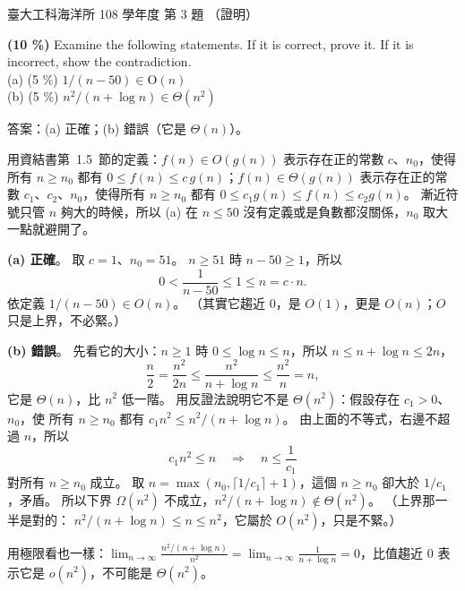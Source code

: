 \begin{pastexam}[label={px:ntu-108-esoe-ds-03}]{臺大工科海洋所 108 學年度 第 3 題}
（證明）

\textbf{(10 \%)} Examine the following statements. If it is correct, prove it. If it is incorrect,
show the contradiction.\\
(a) (5 \%) $1/(n-50) \in \mathrm{O}(n)$\\
(b) (5 \%) $n^2/(n+\log n) \in \Theta(n^2)$
\end{pastexam}

\begin{pastsoln}
答案：(a) 正確；(b) 錯誤（它是 $\Theta(n)$）。

用資結書第~1.5~節的定義：$f(n) \in O(g(n))$ 表示存在正的常數 $c$、$n_0$，使得所有 $n \ge n_0$ 都有
$0 \le f(n) \le c\,g(n)$；$f(n) \in \Theta(g(n))$ 表示存在正的常數 $c_1$、$c_2$、$n_0$，使得所有
$n \ge n_0$ 都有 $0 \le c_1 g(n) \le f(n) \le c_2 g(n)$。 漸近符號只管 $n$ 夠大的時候，所以 (a) 在
$n \le 50$ 沒有定義或是負數都沒關係，$n_0$ 取大一點就避開了。

\textbf{(a) 正確}。 取 $c = 1$、$n_0 = 51$。 $n \ge 51$ 時 $n - 50 \ge 1$，所以
\[
  0 < \frac{1}{n - 50} \le 1 \le n = c \cdot n .
\]
依定義 $1/(n - 50) \in O(n)$。 （其實它趨近 $0$，是 $O(1)$，更是 $O(n)$；$O$ 只是上界，不必緊。）

\textbf{(b) 錯誤}。 先看它的大小：$n \ge 1$ 時 $0 \le \log n \le n$，所以 $n \le n + \log n \le 2n$，
\[
  \frac{n}{2} = \frac{n^2}{2n} \le \frac{n^2}{n + \log n} \le \frac{n^2}{n} = n ,
\]
它是 $\Theta(n)$，比 $n^2$ 低一階。 用反證法說明它不是 $\Theta(n^2)$：假設存在 $c_1 > 0$、$n_0$，使
所有 $n \ge n_0$ 都有 $c_1 n^2 \le n^2/(n + \log n)$。 由上面的不等式，右邊不超過 $n$，所以
\[
  c_1 n^2 \le n \quad\Longrightarrow\quad n \le \frac{1}{c_1}
\]
對所有 $n \ge n_0$ 成立。 取 $n = \max(n_0, \lceil 1/c_1 \rceil + 1)$，這個 $n \ge n_0$ 卻大於 $1/c_1$，矛盾。
所以下界 $\Omega(n^2)$ 不成立，$n^2/(n + \log n) \notin \Theta(n^2)$。 （上界那一半是對的：
$n^2/(n + \log n) \le n \le n^2$，它屬於 $O(n^2)$，只是不緊。）

用極限看也一樣：$\displaystyle\lim_{n \to \infty} \frac{n^2/(n + \log n)}{n^2} =
\lim_{n \to \infty} \frac{1}{n + \log n} = 0$，比值趨近 $0$ 表示它是 $o(n^2)$，不可能是 $\Theta(n^2)$。
\end{pastsoln}
